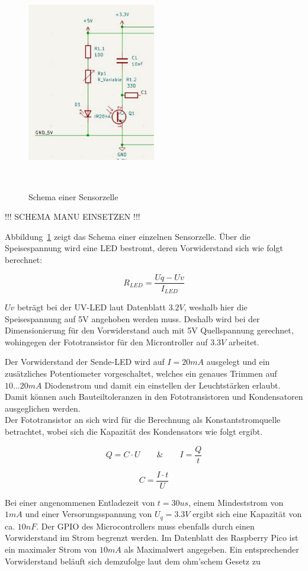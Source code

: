 \documentclass{article}
\begin{document}
\begin{figure}[H]
    \centering
    \includegraphics[width=0.5\textwidth]{Schema_Sensorzelle.pdf}
    \caption{Schema einer Sensorzelle}~\label{fig:Sensorzelle}
\end{figure}


!!! SCHEMA MANU EINSETZEN !!!


Abbildung~\ref{fig:Sensorzelle} zeigt das Schema einer einzelnen Sensorzelle.
Über die Speisespannung wird eine LED bestromt, deren Vorwiderstand sich wie
folgt berechnet:

\[
    R_{LED} = \frac{Uq - Uv}{I_{LED}}
\]

$Uv$ beträgt bei der UV-LED laut Datenblatt $3.2V$, weshalb hier die Speisespannung
auf 5V angehoben werden muss. Deshalb wird bei der Dimensionierung für den Vorwiderstand
auch mit 5V Quellspannung gerechnet, wohingegen der Fototransistor für den Microntroller
auf $3.3V$ arbeitet.

Der Vorwiderstand der Sende-LED wird auf $I=20mA$ ausgelegt und ein
zusätzliches Potentiometer vorgeschaltet, welches ein genaues Trimmen auf
$10...20mA$ Diodenstrom und damit ein einstellen der Leuchtstärken erlaubt.
Damit können auch Bauteiltoleranzen in den Fototransistoren und Kondensatoren
ausgeglichen werden. \\

Der Fototransistor an sich wird für die Berechnung als Konstantstromquelle
betrachtet, wobei sich die Kapazität des Kondensators wie folgt ergibt.

\[
    Q = C \cdot U \qquad \& \qquad I = \frac{Q}{t}
\]

\[
    C = \frac{I \cdot t}{U}
\]

Bei einer angenommenen Entladezeit von $t = 30us$, einem Mindeststrom von $1
    mA$ und einer Versorungsspannung von $U_q = 3.3V$ ergibt sich eine Kapazität
von ca. $10nF$. Der GPIO des Microcontrollers muss ebenfalls durch einen
Vorwiderstand im Strom begrenzt werden. Im Datenblatt des Raspberry Pico ist ein
maximaler Strom von $10 mA$ als Maximalwert angegeben. Ein entsprechender
Vorwiderstand beläuft sich demzufolge laut dem ohm'schem Gesetz zu
\end{document}
